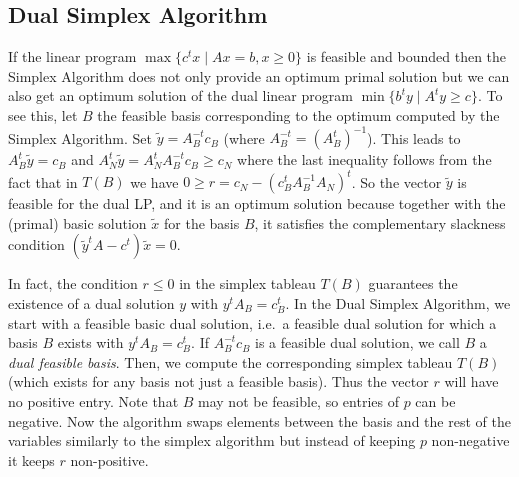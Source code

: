 \documentclass[12pt, showidx, twoside]{article}
\begin{document}
{{{\subsection{Dual Simplex Algorithm}

If the linear program $\max\{ c^t x \mid Ax = b, x \geq0\}$ is feasible and
bounded then the {\sc Simplex Algorithm} does not only provide an optimum
primal solution but we can also get an optimum solution of the dual linear
program $\min\{ b^t y \mid A^t y \geq c\}$. To see this, let $B$ the 
feasible basis corresponding to the optimum computed by the {\sc Simplex Algorithm}.
Set $\tilde y = A_B^{-t} c_B$ (where $A_B^{-t} = (A_B^{t})^{-1}$).  This leads to 
$A_B^t \tilde y = c_B$ and $A_N^t \tilde y = A_N^t A_B^{-t} c_B \geq c_N$ where
the last inequality follows from the fact that in $T(B)$ we have
$0 \geq r = c_N - (c_B^t A_B^{-1} A_N)^t$. So the vector $\tilde y$ is feasible for
the dual LP, and it is an optimum solution because together with the
(primal) basic solution $\tilde x$ for the basis $B$, it satisfies the complementary
slackness condition $(\tilde y^t A - c^t) \tilde x = 0$.

In fact, the condition $r \leq 0$ in the simplex tableau $T(B)$ guarantees the 
existence of a dual solution $y$ with $y^t A_B = c_B^t$. 
In the {\sc Dual Simplex Algorithm}, we start with a feasible basic dual solution,
i.e.\ a feasible dual solution for which a basis $B$ exists with $y^t A_B = c_B^t$.
If $A_B^{-t} c_B$ is a feasible dual solution,
we call $B$ a {\em dual feasible basis}.
Then, we compute the corresponding simplex
tableau $T(B)$ (which exists for any basis not just a feasible basis).
Thus the vector $r$ will have no positive entry.
Note that $B$ may not be feasible, so entries of $p$ can be negative.
Now the algorithm swaps elements between the basis and the rest of the
variables similarly to the simplex algorithm but instead of keeping
$p$ non-negative it keeps $r$ non-positive.

}}}
\end{document}
